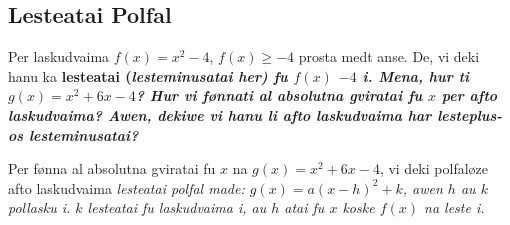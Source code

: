 \subsection{Lesteatai Polfal}
Per laskudvaima \(f\left(x\right) = x^2-4\), \(f\left(x\right)\geq-4\) prosta medt anse. De, vi deki hanu
ka \bf{lesteatai} (\it{lesteminusatai} her) fu \(f\left(x\right)\) \(-4\) i. Mena, hur ti
\(g\left(x\right) = x^2+6x-4\)? Hur vi fønnati al absolutna gviratai fu \(x\) per afto laskudvaima?
Awen, dekiwe vi hanu li afto laskudvaima har lesteplus- os lesteminusatai?

Per fønna al absolutna gviratai fu \(x\) na \(g\left(x\right)=x^2+6x-4\), vi deki polfaløze afto
laskudvaima \it{lesteatai polfal} made: \(g\left(x\right) = a{\left(x-h\right)}^2+k\), awen
\(h\) au \(k\) pollasku i. \(k\) lesteatai fu laskudvaima i, au \(h\) atai fu \(x\) koske \(f\left(x\right)\)
na leste i.
